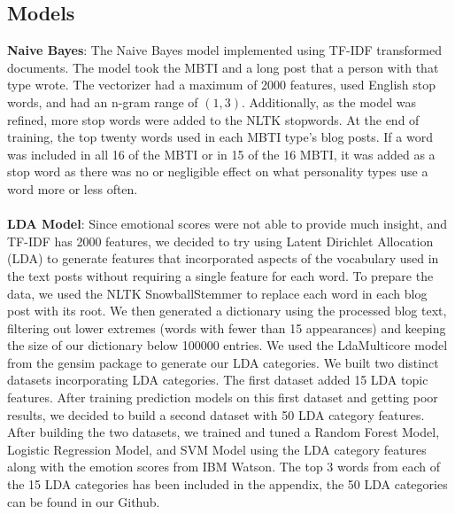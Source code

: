 \documentclass{article}
\begin{document}
\subsection{Models}
\textbf{Naive Bayes}: The Naive Bayes model implemented using TF-IDF transformed documents. The model took the MBTI and a long post that a person with that type wrote. The vectorizer had a maximum of 2000 features, used English stop words, and had an n-gram range of $(1,3)$. Additionally, as the model was refined, more stop words were added to the NLTK stopwords. At the end of training, the top twenty words used in each MBTI type's blog posts. If a word was included in all 16 of the MBTI or in 15 of the 16 MBTI, it was added as a stop word as there was no or negligible effect on what personality types use a word more or less often.  \\ \\
\textbf{LDA Model}: Since emotional scores were not able to provide much insight, and TF-IDF has 2000 features, we decided to try using Latent Dirichlet Allocation (LDA) to generate features that incorporated aspects of the vocabulary used in the text posts without requiring a single feature for each word. To prepare the data, we used the NLTK SnowballStemmer to replace each word in each blog post with its root. We then generated a dictionary using the processed blog text, filtering out lower extremes (words with fewer than 15 appearances) and keeping the size of our dictionary below 100000 entries. We used the LdaMulticore model from the gensim package to generate our LDA categories. We built two distinct datasets incorporating LDA categories. The first dataset added 15 LDA topic features. After training prediction models on this first dataset and getting poor results, we decided to build a second dataset with 50 LDA category features. After building the two datasets, we trained and tuned a Random Forest Model, Logistic Regression Model, and SVM Model using the LDA category features along with the emotion scores from IBM Watson. The top 3 words from each of the 15 LDA categories has been included in the appendix, the 50 LDA categories can be found in our Github.
\end{document}
